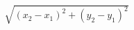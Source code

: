 \documentclass[preview]{standalone}
\begin{document}
\begin{align*}
\sqrt{(x_2 - x_1)^2 + (y_2 - y_1)^2}
\end{align*}
\end{document}
